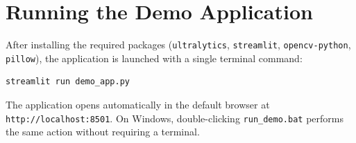\section{Running the Demo Application}

After installing the required packages (\texttt{ultralytics}, \texttt{streamlit}, \texttt{opencv-python}, \texttt{pillow}), the application is launched with a single terminal command:

\begin{lstlisting}[language=bash, caption=Launching the Demo Application]
streamlit run demo_app.py
\end{lstlisting}

The application opens automatically in the default browser at \texttt{http://localhost:8501}. On Windows, double-clicking \texttt{run\_demo.bat} performs the same action without requiring a terminal.

